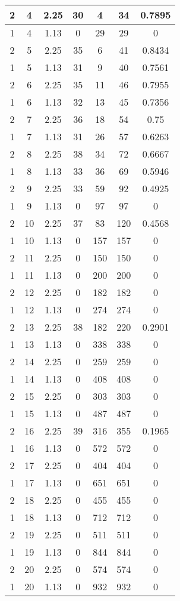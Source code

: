 \documentclass[letterpaper, 12pt]{article}
\begin{document}
\begin{longtable}{|c|c|c|c|c|c|c|}
\hline
2 & 4 & 2.25 & 30 & 4 & 34 & 0.7895 \\
\hline
1 & 4 & 1.13 & 0 & 29 & 29 & 0 \\
\hline
2 & 5 & 2.25 & 35 & 6 & 41 & 0.8434 \\
\hline
1 & 5 & 1.13 & 31 & 9 & 40 & 0.7561 \\
\hline
2 & 6 & 2.25 & 35 & 11 & 46 & 0.7955 \\
\hline
1 & 6 & 1.13 & 32 & 13 & 45 & 0.7356 \\
\hline
2 & 7 & 2.25 & 36 & 18 & 54 & 0.75 \\
\hline
1 & 7 & 1.13 & 31 & 26 & 57 & 0.6263 \\
\hline
2 & 8 & 2.25 & 38 & 34 & 72 & 0.6667 \\
\hline
1 & 8 & 1.13 & 33 & 36 & 69 & 0.5946 \\
\hline
2 & 9 & 2.25 & 33 & 59 & 92 & 0.4925 \\
\hline
1 & 9 & 1.13 & 0 & 97 & 97 & 0 \\
\hline
2 & 10 & 2.25 & 37 & 83 & 120 & 0.4568 \\
\hline
1 & 10 & 1.13 & 0 & 157 & 157 & 0 \\
\hline
2 & 11 & 2.25 & 0 & 150 & 150 & 0 \\
\hline
1 & 11 & 1.13 & 0 & 200 & 200 & 0 \\
\hline
2 & 12 & 2.25 & 0 & 182 & 182 & 0 \\
\hline
1 & 12 & 1.13 & 0 & 274 & 274 & 0 \\
\hline
2 & 13 & 2.25 & 38 & 182 & 220 & 0.2901 \\
\hline
1 & 13 & 1.13 & 0 & 338 & 338 & 0 \\
\hline
2 & 14 & 2.25 & 0 & 259 & 259 & 0 \\
\hline
1 & 14 & 1.13 & 0 & 408 & 408 & 0 \\
\hline
2 & 15 & 2.25 & 0 & 303 & 303 & 0 \\
\hline
1 & 15 & 1.13 & 0 & 487 & 487 & 0 \\
\hline
2 & 16 & 2.25 & 39 & 316 & 355 & 0.1965 \\
\hline
1 & 16 & 1.13 & 0 & 572 & 572 & 0 \\
\hline
2 & 17 & 2.25 & 0 & 404 & 404 & 0 \\
\hline
1 & 17 & 1.13 & 0 & 651 & 651 & 0 \\
\hline
2 & 18 & 2.25 & 0 & 455 & 455 & 0 \\
\hline
1 & 18 & 1.13 & 0 & 712 & 712 & 0 \\
\hline
2 & 19 & 2.25 & 0 & 511 & 511 & 0 \\
\hline
1 & 19 & 1.13 & 0 & 844 & 844 & 0 \\
\hline
2 & 20 & 2.25 & 0 & 574 & 574 & 0 \\
\hline
1 & 20 & 1.13 & 0 & 932 & 932 & 0 \\
\hline
\end{longtable}
\end{document}

